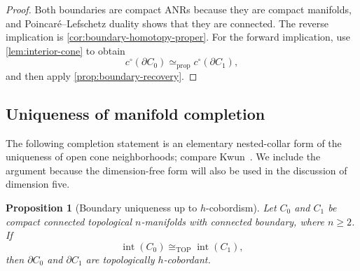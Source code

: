 \documentclass[10pt,reqno]{amsart}
\numberwithin{equation}{section}
\newtheorem{proposition}{Proposition}
\theoremstyle{definition}
\theoremstyle{remark}
\newcommand{\TOP}{\mathrm{TOP}}
\newcommand{\Int}{\operatorname{int}}
\newcommand{\simeqp}{\simeq_{\mathrm{prop}}}
\begin{document}
\begin{proof}
Both boundaries are compact ANRs because they are compact manifolds,
and Poincar\'e--Lefschetz duality shows that they are connected.  The
reverse implication is
\cref{cor:boundary-homotopy-proper}.  For
the forward implication, use \cref{lem:interior-cone} to obtain
\[
c^\circ(\partial C_0)
\simeqp
c^\circ(\partial C_1),
\]
and then apply \cref{prop:boundary-recovery}.
\end{proof}

\subsection{Uniqueness of manifold completion}

The following completion statement is an elementary nested-collar
form of the uniqueness of open cone neighborhoods; compare
Kwun~\cite{KwunOpenCone}.  We include the argument because the
dimension-free form will also be used in the discussion of dimension
five.

\begin{proposition}[Boundary uniqueness up to \(h\)-cobordism]
\label{prop:completion}
Let \(C_0\) and \(C_1\) be compact connected topological
\(n\)-manifolds with connected boundary, where \(n\geq2\).  If
\[
\Int(C_0)\cong_{\TOP}\Int(C_1),
\]
then \(\partial C_0\) and \(\partial C_1\) are topologically
\(h\)-cobordant.
\end{proposition}
\end{document}
